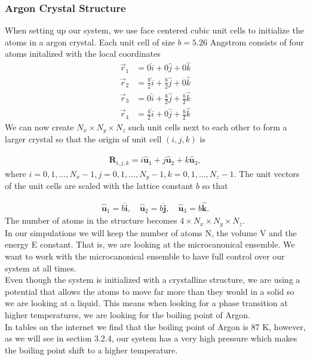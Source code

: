 \documentclass[a4paper, 12pt]{article}
\begin{document}
\subsubsection{Argon Crystal Structure}
When setting up our system, we use face centered cubic unit cells to initialize the atoms in a argon crystal. Each unit cell of size $b = 5.26$ Angstrom consists of four atoms initalized with the local coordinates\\
\begin{align}
\vec{r}_{1} &= 0\hat{i} + 0\hat{j} + 0\hat{k} \\
\vec{r}_{2} &= \frac{b}{2}\hat{i} + \frac{b}{2}\hat{j} + 0\hat{k} \\
\vec{r}_{3} &= 0\hat{i} + \frac{b}{2}\hat{j} + \frac{b}{2}\hat{k} \\
\vec{r}_{4} &= \frac{b}{2}\hat{i} + 0\hat{j} + \frac{b}{2}\hat{k}
\end{align}
We can now create $N_x \times N_y \times N_z$ such unit cells next to each other to form a larger crystal so that the origin of unit cell $(i,j,k)$ is

\begin{align}
	\mathbf{R}_{i,j,k} = i \hat{\mathbf{u}}_1 + j \hat{\mathbf{u}}_2 + k \hat{\mathbf{u}}_3,
\end{align}
where $i=0,1,..., N_x-1, j=0,1,..., N_y-1, k=0,1,..., N_z-1$. The unit vectors of the unit cells are scaled with the lattice constant $b$ so that

\begin{align}
	\hat{\mathbf{u}}_1 = b\hat{\mathbf{i}}, \quad \hat{\mathbf{u}}_2 = b\hat{\mathbf{j}}, \quad \hat{\mathbf{u}}_3 = b\hat{\mathbf{k}}.
\end{align}
 The number of atoms in the structure becomes $4\times N_x \times N_y \times N_z$.\\
In our simpulations we will keep the number of atoms N, the volume V and the energy E constant. That is, we are looking at the microcanonical ensemble. We want to work with the microcanonical ensemble to have full control over our system at all times. \\
Even though the system is initialized with a crystalline structure, we are using a potential that allows the atoms to move far more than they would in a solid so we are looking at a liquid. This means when looking for a phase transition at higher temperatures, we are looking for the boiling point of Argon.\\
In tables on the internet \cite{ArgonBoiling} we find that the boiling point of Argon is 87 K, however, as we will see in section 3.2.4, our system has a very high pressure which makes the boiling point shift to a higher temperature.
\end{document}
